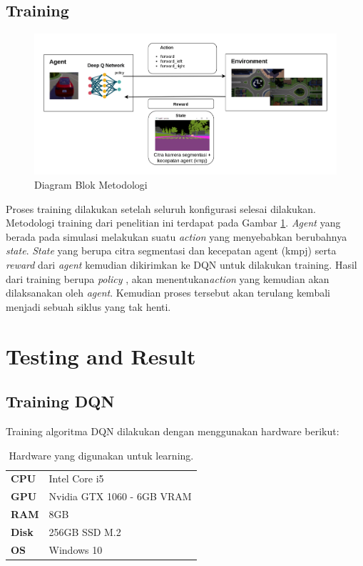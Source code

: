 \documentclass[conference]{IEEEtran}
\begin{document}
\subsection{Training}
\label{sec:training}

\begin{figure}[H] 
	\centering
	\includegraphics[width=1\linewidth]{images/metodologi}
	\caption{Diagram Blok Metodologi}
	\label{fig:blockdiagram}
\end{figure}

Proses training dilakukan setelah seluruh konfigurasi selesai dilakukan. Metodologi training dari penelitian ini terdapat pada Gambar \ref{fig:blockdiagram}. \textit{Agent} yang berada pada simulasi melakukan suatu \textit{action} yang menyebabkan berubahnya \textit{state}. \textit{State} yang berupa citra segmentasi dan kecepatan agent (kmpj) serta \textit{reward }dari \textit{agent} kemudian dikirimkan ke DQN untuk dilakukan training. Hasil dari training berupa \textit{policy },  akan menentukan\textit{action} yang kemudian akan dilaksanakan oleh \textit{agent}. Kemudian proses tersebut akan terulang kembali menjadi sebuah siklus yang tak henti.

	
	
	
	\section{Testing and Result}
	\subsection{Training DQN}
	\label{sec:training_dqn}
	Training algoritma DQN dilakukan dengan menggunakan hardware berikut:
	\begin{table}[H]
		\begin{tabular}{ll}
			\textbf{CPU}  & Intel Core i5              \\
			\textbf{GPU}  & Nvidia GTX 1060 - 6GB VRAM \\
			\textbf{RAM}  & 8GB                        \\
			\textbf{Disk} & 256GB SSD M.2              \\
			\textbf{OS}   & Windows 10                
		\end{tabular}
		\caption{Hardware yang digunakan untuk learning.}
		\label{tb:hardwaresetup}
	\end{table}
	
\end{document}
